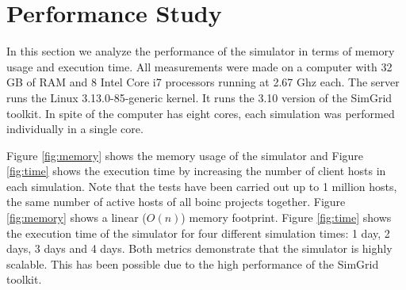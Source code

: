 \clearpage

\section{Performance Study}
\label{sec:performance_study}

In this section we analyze the performance of the simulator in terms of memory usage and execution time. All measurements were made on a computer with 32 GB of RAM and 8 Intel Core i7 processors running at 2.67 Ghz each. The server runs the Linux 3.13.0-85-generic kernel. It runs the 3.10 version of the SimGrid toolkit.  In spite of the computer has eight cores, each simulation was performed individually in a single core. 

Figure \ref{fig:memory} shows the memory usage of the simulator and Figure \ref{fig:time} shows the execution time by increasing the number of client hosts in each simulation. Note that the tests have been carried out up to 1 million hosts, the same number of active hosts of all \gls{boinc} projects together. Figure \ref{fig:memory} shows a linear ($O(n)$) memory footprint. Figure \ref{fig:time} shows the execution time of the simulator for four different simulation times: 1 day, 2 days, 3 days and 4 days. Both metrics demonstrate that the simulator is highly scalable. This has been possible due to the high performance \cite{Legrand2015} of the SimGrid toolkit.

\vspace{1cm}

